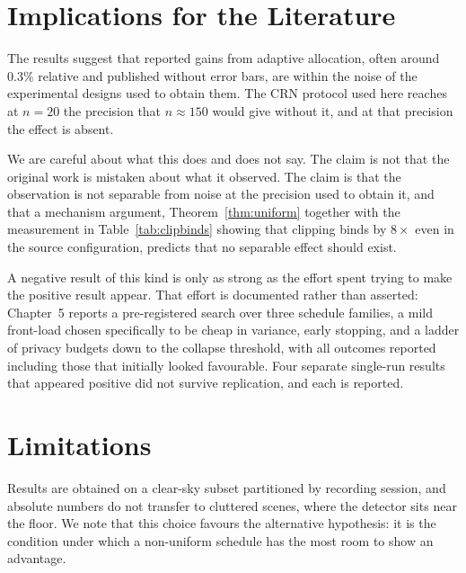\section{Implications for the Literature}

The results suggest that reported gains from adaptive allocation, often around
$0.3\%$ relative and published without error bars, are within the noise of the
experimental designs used to obtain them. The CRN protocol used here reaches at
$n=20$ the precision that $n\approx150$ would give without it, and at that
precision the effect is absent.

\vspace{10pt}

We are careful about what this does and does not say. The claim is not that the
original work is mistaken about what it observed. The claim is that the
observation is not separable from noise at the precision used to obtain it, and
that a mechanism argument, Theorem~\ref{thm:uniform} together with the
measurement in Table~\ref{tab:clipbinds} showing that clipping binds by
$8\times$ even in the source configuration, predicts that no separable effect
should exist.

\vspace{10pt}

A negative result of this kind is only as strong as the effort spent trying to
make the positive result appear. That effort is documented rather than asserted:
Chapter~5 reports a pre-registered search over three schedule families, a mild
front-load chosen specifically to be cheap in variance, early stopping, and a
ladder of privacy budgets down to the collapse threshold, with all outcomes
reported including those that initially looked favourable. Four separate
single-run results that appeared positive did not survive replication, and each
is reported.

\section{Limitations}
\label{sec:limitations}

Results are obtained on a clear-sky subset partitioned by recording session, and
absolute numbers do not transfer to cluttered scenes, where the detector sits
near the floor. We note that this choice favours the alternative hypothesis: it
is the condition under which a non-uniform schedule has the most room to show an
advantage.

\vspace{10pt}

